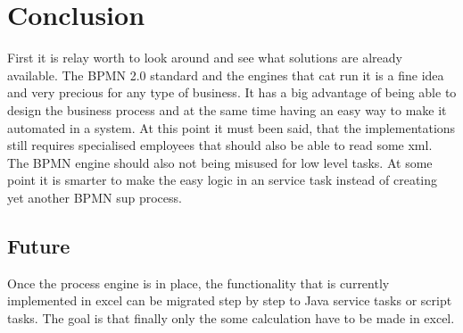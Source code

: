 \documentclass[paper=a4,twoside=false,BCOR=0mm,DIV=calc,fontsize=12pt]{scrartcl}
\begin{document}




\section{Conclusion}
First it is relay worth to look around and see what solutions are already available. The BPMN 2.0 standard and the engines that cat run it is a fine 
idea and very precious for any type of business. It has a big advantage of being able to design the business process and at the same time having an easy way to make it automated in a system.
At this point it must been said, that the implementations still requires specialised employees that should also be able to read some xml. The BPMN engine should also not being misused for low level tasks. At some point it is smarter to make the easy logic in an service task instead of creating yet another BPMN sup process.




\subsection{Future}
Once the process engine is in place, the functionality that is currently implemented in excel can be migrated step by step to Java service tasks or script tasks. The goal is that finally only the some calculation have to be made in excel.



\newpage
\end{document}
